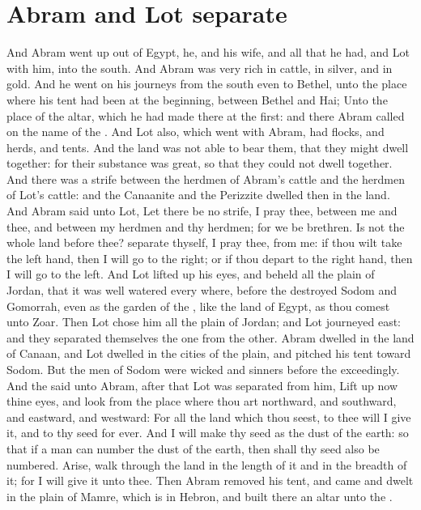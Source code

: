 \section*{Abram and Lot separate}
\begin{biblechapter} %
\verse And Abram went up out of Egypt, he, and his wife, and all that he had, and Lot with him, into the south.
\verse And Abram was very rich in cattle, in silver, and in gold.
\verse And he went on his journeys from the south even to Bethel, unto the place where his tent had been at the beginning, between Bethel and Hai;
\verse Unto the place of the altar, which he had made there at the first: and there Abram called on the name of the \LORD.
\verse And Lot also, which went with Abram, had flocks, and herds, and tents.
\verse And the land was not able to bear them, that they might dwell together: for their substance was great, so that they could not dwell together.
\verse And there was a strife between the herdmen of Abram's cattle and the herdmen of Lot's cattle: and the Canaanite and the Perizzite dwelled then in the land.
\verse And Abram said unto Lot, Let there be no strife, I pray thee, between me and thee, and between my herdmen and thy herdmen; for we be brethren.
\verse Is not the whole land before thee? separate thyself, I pray thee, from me: if thou wilt take the left hand, then I will go to the right; or if thou depart to the right hand, then I will go to the left.
\verse And Lot lifted up his eyes, and beheld all the plain of Jordan, that it was well watered every where, before the \LORD destroyed Sodom and Gomorrah, even as the garden of the \LORD, like the land of Egypt, as thou comest unto Zoar.
\verse Then Lot chose him all the plain of Jordan; and Lot journeyed east: and they separated themselves the one from the other.
\verse Abram dwelled in the land of Canaan, and Lot dwelled in the cities of the plain, and pitched his tent toward Sodom.
\verse But the men of Sodom were wicked and sinners before the \LORD exceedingly.
\verse And the \LORD said unto Abram, after that Lot was separated from him, Lift up now thine eyes, and look from the place where thou art northward, and southward, and eastward, and westward:
\verse For all the land which thou seest, to thee will I give it, and to thy seed for ever.
\verse And I will make thy seed as the dust of the earth: so that if a man can number the dust of the earth, then shall thy seed also be numbered.
\verse Arise, walk through the land in the length of it and in the breadth of it; for I will give it unto thee.
\verse Then Abram removed his tent, and came and dwelt in the plain of Mamre, which is in Hebron, and built there an altar unto the \LORD.
\end{biblechapter}

